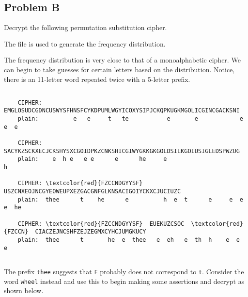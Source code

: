 \documentclass[../hw_sols.tex]{subfiles}
\begin{document}
\subsection*{Problem B}

Decrypt the following permutation substitution cipher.

\begin{solution}

The file  is used to generate the frequency 
distribution.




The frequency distribution is very close to that of a monoalphabetic cipher. 
We can begin to take guesses for certain letters based on the distribution. 
Notice, there is an 11-letter word repeated twice with a 5-letter prefix.

\begin{BVerbatim}[commandchars=\\\{\}]

    CIPHER: EMGLOSUDCGDNCUSWYSFHNSFCYKDPUMLWGYICOXYSIPJCKQPKUGKMGOLICGINCGACKSNI
    plain:          e   e     t   te           e       e            e   e  e

    CIPHER: SACYKZSCKXECJCKSHYSXCGOIDPKZCNKSHICGIWYGKKGKGOLDSILKGOIUSIGLEDSPWZUG
    plain:    e  h e   e e      e      he     e                              h

    CIPHER: \textcolor{red}{FZCCNDGYYSF}  USZCNXEOJNCGYEOWEUPXEZGACGNFGLKNSACIGOIYCKXCJUCIUZC
    plain:  thee      t    he      e          h  e  t      e     e  e  e  he

    CIPHER: \textcolor{red}{FZCCNDGYYSF}  EUEKUZCSOC  \textcolor{red}{FZCCN}  CIACZEJNCSHFZEJZEGMXCYHCJUMGKUCY
    plain:  thee      t       he  e  thee   e  eh   e  th  h    e  e      e
	
\end{BVerbatim}

The prefix \verb|thee| suggests that \verb|F| probably does not correspond to 
\verb|t|. Consider the word {\color{red}\verb|wheel|} instead and use this to 
begin making some assertions and decrypt as shown below.

\end{solution}
\end{document}
